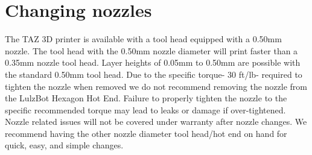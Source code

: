 \section{Changing nozzles}
The TAZ 3D printer is available with a tool head equipped with a 0.50mm nozzle. The tool head with the 0.50mm nozzle diameter will print faster than a 0.35mm nozzle tool head. Layer heights of 0.05mm to 0.50mm are possible with the standard 0.50mm tool head.  Due to the specific torque- 30 ft/lb- required to tighten the nozzle when removed we do not recommend removing the nozzle from the LulzBot\textsuperscript{\miniscule{\texttrademark}} Hexagon Hot End. Failure to properly tighten the nozzle to the specific recommended torque may lead to leaks or damage if over-tightened. Nozzle related issues will not be covered under warranty after nozzle changes. We recommend having the other nozzle diameter tool head/hot end on hand for quick, easy, and simple changes.



